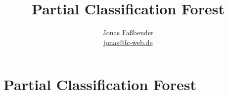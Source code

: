 \documentclass[journal]{IEEEtran}
\title{Partial Classification Forest}
\author{Jonas Fa{\ss}bender \\ [1ex]
  \href{mailto: jonas@fc-web.de}
  {jonas@fc-web.de}}
\date{}
\begin{document}

\maketitle

\begin{abstract}
\end{abstract}





\section{Partial Classification Forest}




%
%
%






\end{document}
